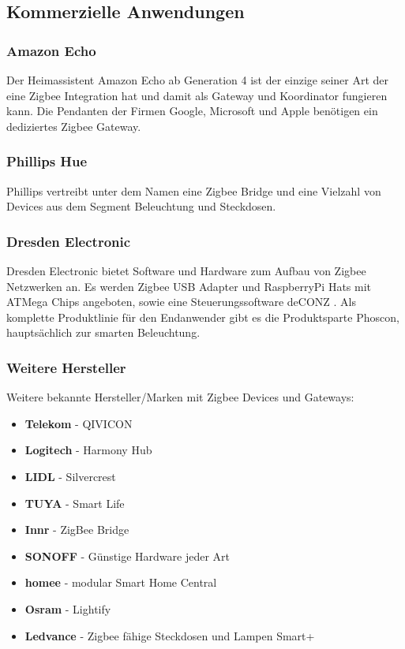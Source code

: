\subsection{Kommerzielle Anwendungen}

\subsubsection{Amazon Echo}
    Der Heimassistent Amazon Echo ab Generation 4 ist der einzige seiner Art der eine Zigbee Integration hat und damit als Gateway und Koordinator fungieren
    kann. Die Pendanten der Firmen Google, Microsoft und Apple benötigen ein dediziertes Zigbee Gateway.

\subsubsection{Phillips Hue}
    Phillips vertreibt unter dem Namen eine Zigbee Bridge und eine Vielzahl von Devices aus dem Segment Beleuchtung und Steckdosen. 

\subsubsection{Dresden Electronic}
    Dresden Electronic bietet Software und Hardware zum Aufbau von Zigbee Netzwerken an. Es werden Zigbee USB Adapter und RaspberryPi Hats mit ATMega Chips angeboten,
    sowie eine Steuerungssoftware \grqq deCONZ \grqq{}. Als komplette Produktlinie für den Endanwender gibt es die Produktsparte
    \grqq Phoscon\grqq{}, hauptsächlich zur smarten Beleuchtung.

\subsubsection*{Weitere Hersteller}
Weitere bekannte Hersteller/Marken mit Zigbee Devices und Gateways:
\begin{itemize}
    \item \textbf{Telekom} - QIVICON
    \item \textbf{Logitech} - Harmony Hub
    \item \textbf{LIDL} - Silvercrest
    \item \textbf{TUYA} - Smart Life
    \item \textbf{Innr} - ZigBee Bridge
    \item \textbf{SONOFF} - Günstige Hardware jeder Art
    \item \textbf{homee} -  modular Smart Home Central
    \item \textbf{Osram} - Lightify
    \item \textbf{Ledvance} - Zigbee fähige Steckdosen und Lampen \grqq Smart+ \grqq{}
\end{itemize}

